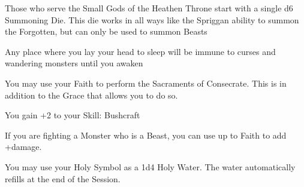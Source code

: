 {\newpage






Those who serve the Small Gods of the Heathen Throne start with a single d6 Summoning Die.  This die works in all ways like the Spriggan ability to summon the Forgotten, but can only be used to summon Beasts







\GOD[
Name=Brigid,
Link=small-god-brigid,
GodOf=Seraph of Hearth and Gardens,
Holy=a shillelagh
]


Any place where you lay your head to sleep will be immune to curses and wandering monsters until you awaken


You may use your Faith to perform the Sacraments of Consecrate. This is in addition to the Grace that allows you to do so.




\GOD[
Name=Cernunnos,
Link=small-god-cernunnos,
GodOf=Archon of the Hunt,
Holy=a tine of the antler of a game animal
]


You gain +2 to your Skill: Bushcraft


If you are fighting a Monster who is a Beast, you can use up to \LVL Faith to add +\SUMDICE damage.




\GOD[
Name=Ildavir,
Link=small-god-ildavir,
GodOf=Lady of the Glade,
Holy=a vial of clear water
]


You may use your Holy Symbol as a 1d4 Holy Water. The water automatically refills at the end of the Session.

}
